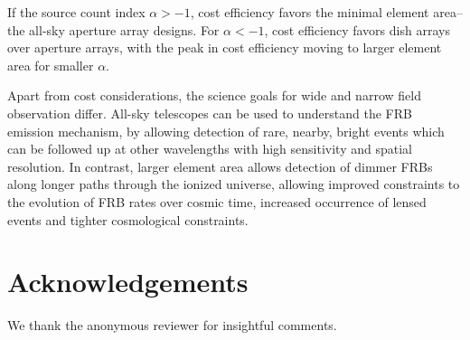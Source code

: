\documentclass[fleqn,usenatbib]{mnras}
\begin{document}
If the source count index $\alpha > -1$, cost efficiency favors the minimal element area--the all-sky aperture array designs.  For $\alpha < -1$, cost efficiency favors dish arrays over aperture arrays, with the peak in cost efficiency moving to larger element area for smaller $\alpha$.

Apart from cost considerations, the science goals for wide and narrow field observation differ.
All-sky telescopes can be used to understand the FRB emission mechanism, by allowing detection of rare, nearby, bright events which can be followed up at other wavelengths with high sensitivity and spatial resolution. In contrast, larger element area allows detection of dimmer FRBs along longer paths through the ionized universe, allowing improved constraints to the evolution of FRB rates over cosmic time, increased occurrence of lensed events and tighter cosmological constraints.

\section*{Acknowledgements}
We thank the anonymous reviewer for insightful comments.








\label{lastpage}
\end{document}
